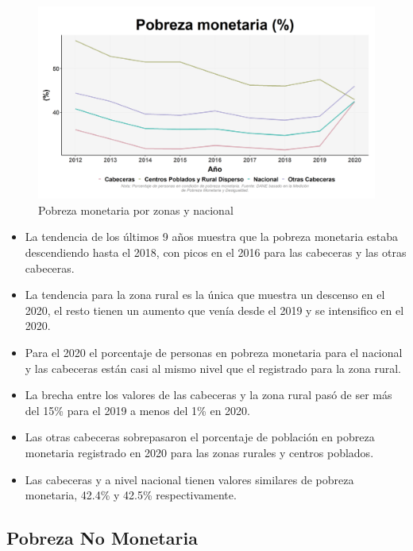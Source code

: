     \begin{figure}[H]
        \caption{Pobreza monetaria por zonas y nacional \label{map_result_2} }
        \begin{center}
        \includegraphics[width=\textwidth,keepaspectratio]{img/var_264_trend.png}
        \end{center}
    \end{figure}
            \begin{itemize}
                    \item La tendencia de los últimos 9 años muestra que la pobreza monetaria estaba descendiendo hasta el 2018, con picos en el 2016 para las cabeceras y las otras cabeceras.
                    \item La tendencia para la zona rural es la única que muestra un descenso en el 2020, el resto tienen un aumento que venía desde el 2019 y se intensifico en el 2020.
                    \item Para el 2020 el porcentaje de personas en pobreza monetaria para el nacional y las cabeceras están casi al mismo nivel que el registrado para la zona rural.
                    \item La brecha entre los valores de las cabeceras y la zona rural pasó de ser más del 15\% para el 2019 a menos del 1\% en 2020.
                    \item Las otras cabeceras sobrepasaron el porcentaje de población en pobreza monetaria registrado en 2020 para las zonas rurales y centros poblados.
                    \item Las cabeceras y a nivel nacional tienen valores similares de pobreza monetaria, 42.4\% y 42.5\% respectivamente.
                    \end{itemize}

    \subsection{Pobreza No Monetaria}

